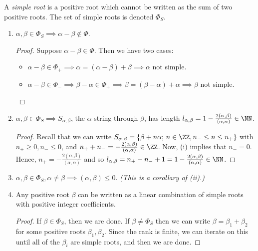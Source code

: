 \documentclass{jknotes}
\begin{document}
\begin{defn}
    A \emph{simple root} is a positive root which cannot be written as the sum of two positive roots. The set of simple roots is denoted \(\Phi_S\).
\end{defn}

\begin{lemma}
    \begin{enumerate}[label=(\roman*)]
        \item \(\alpha,\beta \in \Phi_S \implies \alpha-\beta \not\in \Phi\).
            \begin{proof}
                Suppose \(\alpha-\beta \in \Phi\). Then we have two cases:
                \begin{itemize}
                    \item \(\alpha-\beta \in \Phi_+ \implies \alpha = (\alpha-\beta) + \beta \implies \alpha\) not simple.
                    \item \(\alpha-\beta \in \Phi_- \implies \beta-\alpha \in \Phi_+ \implies \beta = (\beta-\alpha)+\alpha \implies \beta\) not simple. \qedhere
                \end{itemize}
            \end{proof}
        \item \(\alpha,\beta \in \Phi_S \implies S_{\alpha,\beta}\), the \(\alpha\)-string through \(\beta\), has length \(l_{\alpha,\beta} = 1 - \frac{2(\alpha,\beta)}{(\alpha,\alpha)} \in \NN\).
            \begin{proof}
                Recall that we can write \(S_{\alpha,\beta} = \{\beta+n\alpha;\, n \in \ZZ, n_- \le n \le n_+\}\) with \(n_+\ge0,n_-\le0\), and \(n_++n_- = - \frac{2(\alpha,\beta)}{(\alpha,\alpha)} \in \ZZ\). Now, (i) implies that \(n_- = 0\). Hence, \(n_+ = - \frac{2(\alpha,\beta)}{(\alpha,\alpha)}\) and so \(l_{\alpha,\beta} = n_+-n_-+1 = 1 - \frac{2(\alpha,\beta)}{(\alpha,\alpha)} \in \NN\).
            \end{proof}
        \item \(\alpha,\beta \in \Phi_S, \alpha \ne \beta \implies (\alpha,\beta) \le 0\). \emph{(This is a corollary of \emph{(ii)}.)}
        \item Any positive root \(\beta\) can be written as a linear combination of simple roots with positive integer coefficients.
            \begin{proof}
                If \(\beta \in \Phi_S\), then we are done. If \(\beta \ne \Phi_S\) then we can write \(\beta = \beta_1 + \beta_2\) for some positive roots \(\beta_1,\beta_2\). Since the rank is finite, we can iterate on this until all of the \(\beta_i\) are simple roots, and then we are done.

\end{proof}
\end{enumerate}
\end{lemma}
\end{document}
